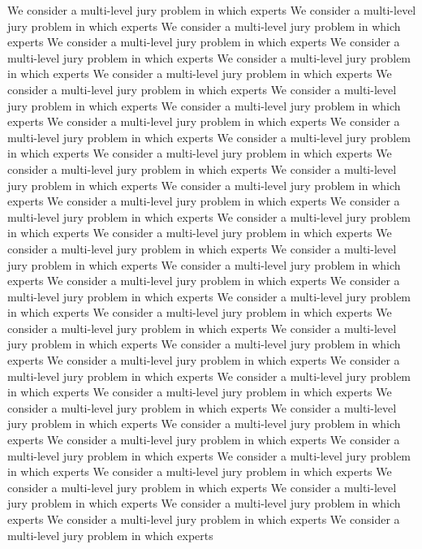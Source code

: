 \documentclass[letterpaper]{article} %
\begin{document}
%
We consider a multi-level jury problem in which experts
We consider a multi-level jury problem in which experts
We consider a multi-level jury problem in which experts
We consider a multi-level jury problem in which experts
We consider a multi-level jury problem in which experts
We consider a multi-level jury problem in which experts
We consider a multi-level jury problem in which experts
We consider a multi-level jury problem in which experts
We consider a multi-level jury problem in which experts
We consider a multi-level jury problem in which experts
We consider a multi-level jury problem in which experts
We consider a multi-level jury problem in which experts
We consider a multi-level jury problem in which experts
We consider a multi-level jury problem in which experts
We consider a multi-level jury problem in which experts
We consider a multi-level jury problem in which experts
We consider a multi-level jury problem in which experts
We consider a multi-level jury problem in which experts
We consider a multi-level jury problem in which experts
We consider a multi-level jury problem in which experts
We consider a multi-level jury problem in which experts
We consider a multi-level jury problem in which experts
We consider a multi-level jury problem in which experts
We consider a multi-level jury problem in which experts
We consider a multi-level jury problem in which experts
We consider a multi-level jury problem in which experts
We consider a multi-level jury problem in which experts
We consider a multi-level jury problem in which experts
We consider a multi-level jury problem in which experts
We consider a multi-level jury problem in which experts
We consider a multi-level jury problem in which experts
We consider a multi-level jury problem in which experts
We consider a multi-level jury problem in which experts
We consider a multi-level jury problem in which experts
We consider a multi-level jury problem in which experts
We consider a multi-level jury problem in which experts
We consider a multi-level jury problem in which experts
We consider a multi-level jury problem in which experts
We consider a multi-level jury problem in which experts
We consider a multi-level jury problem in which experts
We consider a multi-level jury problem in which experts
We consider a multi-level jury problem in which experts
We consider a multi-level jury problem in which experts
We consider a multi-level jury problem in which experts
We consider a multi-level jury problem in which experts
We consider a multi-level jury problem in which experts
We consider a multi-level jury problem in which experts
\clearpage

\end{document}
